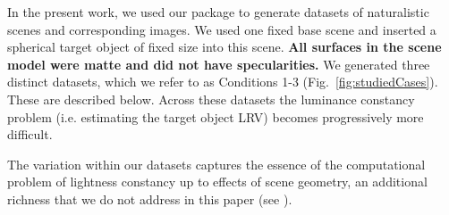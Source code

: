 \documentclass{jov}
\providecommand{\DIFaddtex}[1]{{\bf #1}} %
\providecommand{\DIFaddbegin}{} %
\providecommand{\DIFaddend}{} %
\providecommand{\DIFadd}[1]{\texorpdfstring{\DIFaddtex{#1}}{#1}} %
\newcommand{\DIFaddincludegraphics}[2][]{{\color{blue}\fbox{\DIFOincludegraphics[#1]{#2}}}} %
\DeclareRobustCommand{\DIFaddbegin}{\DIFOaddbegin \let\includegraphics\DIFaddincludegraphics} %
\DeclareRobustCommand{\DIFaddend}{\DIFOaddend \let\includegraphics\DIFOincludegraphics} %
\begin{document}
In the present work, we used our package to generate datasets of naturalistic scenes and corresponding images.
We used one fixed base scene and inserted a spherical target object of fixed size into this scene.
\DIFaddbegin \DIFadd{All surfaces in the scene model were matte and did not have specularities.
}\DIFaddend We generated three distinct datasets, which we refer to as Conditions 1-3 (Fig.~\ref{fig:studiedCases}). These are described below.
Across these datasets the luminance constancy problem (i.e. estimating the target object LRV)
becomes progressively more difficult.

The variation within our datasets captures the essence of the computational problem of lightness constancy
up to effects of scene geometry, an additional richness that we do not address in this paper (see ).
\end{document}
